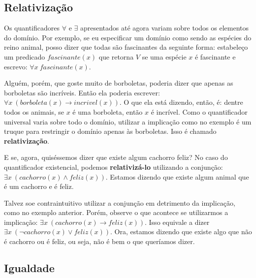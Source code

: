     \subsection{Relativização}

        Os quantificadores $\forall$ e $\exists$ apresentados até agora variam sobre todos os elementos do domínio.
        Por exemplo, se eu especificar um domínio como sendo as espécies do reino animal, posso dizer que todas são fascinantes da seguinte forma:
        estabeleço um predicado $fascinante(x)$ que retorna $V$ se uma espécie $x$ é fascinante e escrevo: $\forall x \ fascinante(x)$.
        
        Alguém, porém, que goste muito de borboletas, poderia dizer que apenas as borboletas são incríveis. Então ela poderia escrever:
        $\forall x \ (borboleta(x) \rightarrow incrivel(x))$. O que ela está dizendo, então, é: dentre todos os animais, se $x$ é uma borboleta, então $x$ é incrível.
        Como o quantificador universal varia sobre todo o domínio, utilizar a implicação como no exemplo é um truque para restringir o domínio apenas às borboletas.
        Isso é chamado \textbf{relativização}.

        E se, agora, quiséssemos dizer que existe algum cachorro feliz? No caso do quantificador existencial, podemos \textbf{relativizá-lo} utilizando a conjunção:
        $\exists x \ (cachorro(x) \land feliz(x))$. Estamos dizendo que existe algum animal que é um cachorro e é feliz.

        Talvez soe contraintuitivo utilizar a conjunção em detrimento da implicação, como no exemplo anterior. Porém, observe o que acontece se utilizarmos a implicação:
        $\exists x \ (cachorro(x) \rightarrow feliz(x))$. Isso equivale a dizer $\exists x \ (\lnot cachorro(x) \lor feliz(x))$. Ora, estamos dizendo que existe algo que não é cachorro ou é feliz, ou seja, não é bem o que queríamos dizer.

    \subsection{Igualdade}

